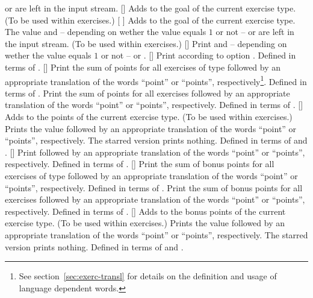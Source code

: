 \documentclass{xsim-manual}
\begin{document}
\begin{commands}
     or  are left in the input stream.
  []
    Adds  to the goal  of the current exercise
    type. (To be used within exercises.)
  [%
    ]
    Adds  to the goal  of the current exercise type.
    The value and -- depending on wether the value equals $1$ or not --
     or  are left in the input stream. (To be used
    within exercises.)
  []
    Print  and -- depending on wether the value equals $1$ or not --
     or .
  []
    Print  according to option .  Defined in
    terms of .
  []
    Print the sum of points for all exercises of type  followed by
    an appropriate translation of the words \enquote{point} or
    \enquote{points}, respectively\footnote{See section~\vref{sec:exerc-transl}
      for details on the definition and usage of language dependent words.}.
    Defined in terms of .
    Print the sum of points for all exercises followed by an appropriate
    translation of the words \enquote{point} or \enquote{points},
    respectively.  Defined in terms of .
  [\sarg{}]
    Adds  to the points of the current exercise type. (To be used
    within exercises.)  Prints the value followed by an appropriate
    translation of the words \enquote{point} or \enquote{points},
    respectively.  The starred version prints nothing.  Defined in terms of
     and .
  []
    Print  followed by an appropriate translation of the words
    \enquote{point} or \enquote{points}, respectively.  Defined in terms of
    .
  []
    Print the sum of bonus points for all exercises of type 
    followed by an appropriate translation of the words \enquote{point} or
    \enquote{points}, respectively.  Defined in terms of
    .
    Print the sum of bonus points for all exercises followed by an appropriate
    translation of the words \enquote{point} or \enquote{points},
    respectively.  Defined in terms of .
  [\sarg{}]
    Adds  to the bonus points of the current exercise type. (To be
    used within exercises.)  Prints the value followed by an appropriate
    translation of the words \enquote{point} or \enquote{points},
    respectively.  The starred version prints nothing.  Defined in terms of
     and .
\end{commands}
\end{document}

